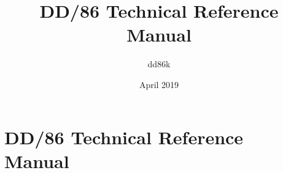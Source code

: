 \documentclass[12pt,a4paper]{book}
\begin{document}
\title{DD/86 Technical Reference Manual}
\author{dd86k}
\date{April 2019}

\part*{DD/86 Technical Reference Manual}

\tableofcontents






\end{document}
